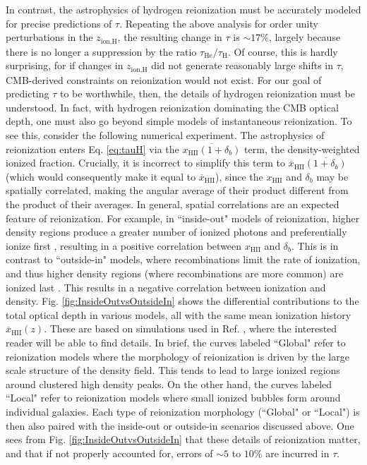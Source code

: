 \documentclass[twocolumn,aps,prd,nofootinbib,showpacs,superscriptaddress]{revtex4-1}
\begin{document}
In contrast, the astrophysics of hydrogen reionization must be accurately modeled for precise predictions of $\tau$. Repeating the above analysis for order unity perturbations in the $z_\textrm{ion,H}$, the resulting change in $\tau$ is $\sim 17\%$, largely because there is no longer a suppression by the ratio $\tau_\textrm{He} / \tau_\textrm{H}$. Of course, this is hardly surprising, for if changes in $z_\textrm{ion,H}$ did not generate reasonably large shifts in $\tau$, CMB-derived constraints on reionization would not exist. For our goal of predicting $\tau$ to be worthwhile, then, the details of hydrogen reionization must be understood. In fact, with hydrogen reionization dominating the CMB optical depth, one must also go beyond simple models of instantaneous reionization. To see this, consider the following numerical experiment. The astrophysics of reionization enters Eq. \eqref{eq:tauH} via the $\overline{x_\textrm{HII} (1+\delta_b)}$ term, the density-weighted ionized fraction. Crucially, it is incorrect to simplify this term to $\overline{x}_\textrm{HII}\overline{ (1+\delta_b)}$ (which would consequently make it equal to $\overline{x}_\textrm{HII}$), since the $x_\textrm{HII}$ and $\delta_b$ may be spatially correlated, making the angular average of their product different from the product of their averages. In general, spatial correlations are an expected feature of reionization. For example, in ``inside-out" models of reionization, higher density regions produce a greater number of ionized photons and preferentially ionize first \cite{barkana_and_loeb2004,furlanetto_et_al2006}, resulting in a positive correlation between $x_\textrm{HII}$ and $\delta_b$. This is in contrast to ``outside-in" models, where recombinations limit the rate of ionization, and thus higher density regions (where recombinations are more common) are ionized last \cite{Miralda-Escude_et_al2000}. This results in a negative correlation between ionization and density. Fig. \ref{fig:InsideOutvsOutsideIn} shows the differential contributions to the total optical depth in various models, all with the same mean ionization history $\overline{x}_\textrm{HII} (z) $. These are based on simulations used in Ref. \cite{watkinson_and_pritchard2014}, where the interested reader will be able to find details. In brief, the curves labeled ``Global" refer to reionization models where the morphology of reionization is driven by the large scale structure of the density field. This tends to lead to large ionized regions around clustered high density peaks. On the other hand, the curves labeled ``Local" refer to reionization models where small ionized bubbles form around individual galaxies. Each type of reionization morphology (``Global" or ``Local") is then also paired with the inside-out or outside-in scenarios discussed above. One sees from Fig. \ref{fig:InsideOutvsOutsideIn} that these details of reionization matter, and that if not properly accounted for, errors of $\sim 5$ to $10\%$ are incurred in $\tau$.
\end{document}
